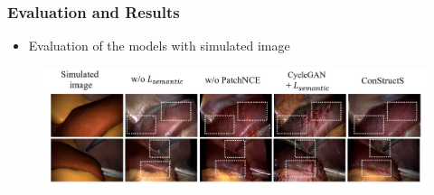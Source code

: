 \documentclass[aspectratio=169, lecture, amberg]{OTHAWbeamer}
\begin{document}
\begin{frame}
    \frametitle{Evaluation and Results}
    \begin{itemize}
        \item Evaluation of the models with simulated image
    \end{itemize}
    \begin{figure}
        \centering
        \includegraphics[width=1.0\linewidth]{result.png} %
        
    \end{figure}
\end{frame}
\end{document}
